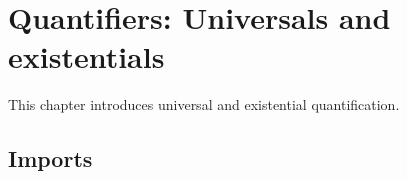 \hypertarget{Quantifiers}{%
\chapter{Quantifiers: Universals and existentials}\label{Quantifiers}}

\begin{fence}
\begin{code}%
\>[0]\AgdaSpace{}%
\AgdaSpace{}%
\<%
\end{code}
\end{fence}

This chapter introduces universal and existential quantification.

\hypertarget{imports}{%
\section{Imports}\label{imports}}


